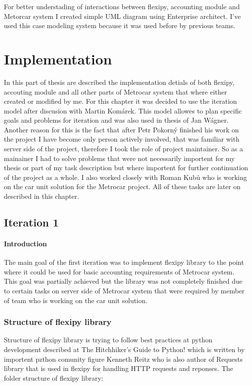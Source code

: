 \documentclass[11pt,twoside,a4paper]{book}
\begin{document}
For better understading of interactions between flexipy, accounting module and Metorcar system I created simple UML diagram using Enterprise architect. I've used this case modeling system because it was used before by previous teams.

\chapter{Implementation}
In this part of thesis are described the implementation detials of both flexipy, accouting module and all other parts of Metrocar system that where either created or modified by me. For this chapter it was decided to use the iteration model after discusion with Martin Komárek. This model allowes to plan specific goals and problems for iteration and was also used in thesis of Jan Wágner. Another reason for this is the fact that after Petr Pokorný finished his work on the project I have become only person actively involved, that was familiar with server side of the project, therefore I took the role of project maintainer. So as a mainainer I had to solve problems that were not necessarily importent for my thesis or part of my task description but where importent for further continuation of the project as a whole. I also worked closely with Roman Kubů who is working on the car unit solution for the Metrocar project. All of these tasks are later on described in this chapter.

\section{Iteration 1}
\subsubsection{Introduction}
The main goal of the first iteration was to implement flexipy library to the point where it could be used for basic accounting requirements of Metrocar system. This goal was partially achieved but the library was not completely finished due to certain tasks on server side of Metrocar system that were required by member of team who is working on the car unit solution.   

\subsection{Structure of flexipy library}
Structure of flexipy library is trying to follow best practices at python development described at The Hitchhiker’s Guide to Python!\cite{pythonGuide} which is written by importent pzthon comunity figure Kenneth Reitz who is also author of Requests library that is used in flexipy for handling HTTP requests and reponses. The folder structure of flexipy library: 
\end{document}

